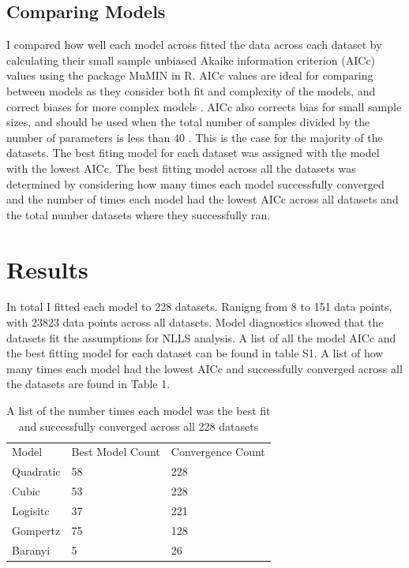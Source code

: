 \documentclass[titlepage]{article}
\begin{document}
  
\subsection{Comparing Models}
  
I compared how well each model across fitted the data across each dataset by calculating their small sample unbiased Akaike information criterion (AICc) values  using the package MuMIN \cite{barton2015package} in R. AICc values are ideal for comparing between models as they consider both fit and complexity of the models, and correct biases for more complex models \cite{johnson2004model}. AICc also corrects bias for small sample sizes, and should be used when the total number of samples divided by the number of parameters is less than 40 \cite{johnson2004model}. This is the case for the majority of the datasets. The best fiting model for each dataset was assigned with the model with the lowest AICc. The best fitting model across all the datasets was determined by considering how many times each model successfully converged and the number of times each model had the lowest AICc across all datasets and the total number datasets where they successfully ran. 
  
  
  
\section{Results}
  
In total I fitted each model to 228 datasets. Ranigng from 8 to 151 data points, with 23823 data points across all datasets. Model diagnostics showed that the datasets fit the assumptions for NLLS analysis. A list of all the model AICc and the best fitting model for each dataset can be found in table S1. A list of how many times each model had the lowest AICc and successfully converged across all the datasets are found in Table 1. 

\begin{table}[t]
 \label{Table 1}
\caption{\footnotesize A list of the number times each model was the best fit and successfully converged across all 228 datasets}
\begin{tabular}{lll}
Model     & Best Model Count & Convergence Count \\
Quadratic & 58               & 228               \\
Cubic     & 53               & 228               \\
Logisitc  & 37              & 221               \\
Gompertz  & 75              & 128               \\
Baranyi   & 5               & 26                
\end{tabular}
\end{table}
\end{document}
